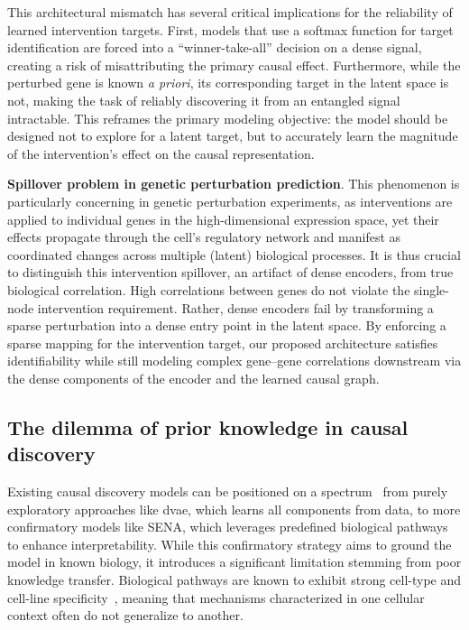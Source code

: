 \documentclass[10pt,letterpaper]{article}
\theoremstyle{definition}
\theoremstyle{remark}
\newcommand{\apriori}{\emph{a priori}}
\begin{document}
This architectural mismatch has several critical implications for the reliability of learned intervention targets.
First, models that use a softmax function for target identification are forced into a ``winner-take-all'' decision on a dense signal, creating a risk of misattributing the primary causal effect.
Furthermore, while the perturbed gene is known \apriori, its corresponding target in the latent space is not, making the task of reliably discovering it from an entangled signal intractable.
This reframes the primary modeling objective: the model should be designed not to explore for a latent target, but to accurately learn the magnitude of the intervention's effect on the causal representation.

\textbf{Spillover problem in genetic perturbation prediction}. This phenomenon is particularly concerning in genetic perturbation experiments, as interventions are applied to individual genes in the high-dimensional expression space, yet their effects propagate through the cell's regulatory network and manifest as coordinated changes across multiple (latent) biological processes.
It is thus crucial to distinguish this intervention spillover, an artifact of dense encoders, from true biological correlation. High correlations between genes do not violate the single-node intervention requirement.
Rather, dense encoders fail by transforming a sparse perturbation into a dense entry point in the latent space.
By enforcing a sparse mapping for the intervention target, our proposed architecture satisfies identifiability while still modeling complex gene--gene correlations downstream via the dense components of the encoder and the learned causal graph.

\subsection*{The dilemma of prior knowledge in causal discovery}
Existing causal discovery models can be positioned on a spectrum~\cite{pmlr-v235-herrmann24b} from purely exploratory approaches like \gls{dvae}, which learns all components from data, to more confirmatory models like SENA, which leverages predefined biological pathways to enhance interpretability. While this confirmatory strategy aims to ground the model in known biology, it introduces a significant limitation stemming from poor knowledge transfer. Biological pathways are known to exhibit strong cell-type and cell-line specificity~\cite{schneider2017tissue,gamazon2018using,walter2019biological,hekselman2020mechanisms}, meaning that mechanisms characterized in one cellular context often do not generalize to another.
\end{document}
